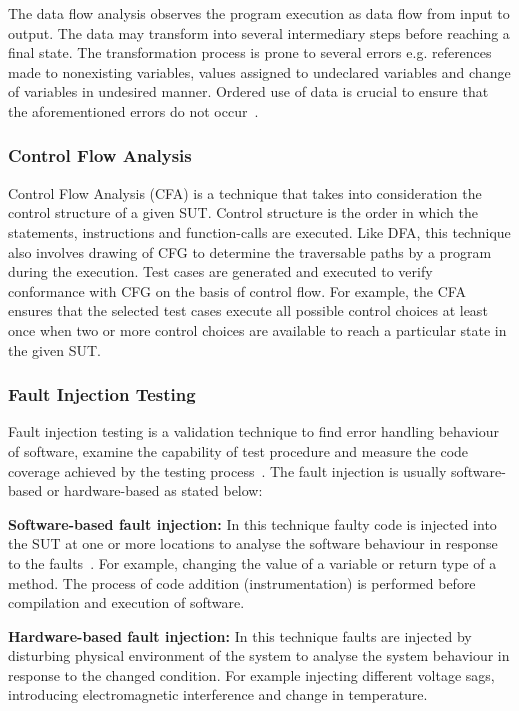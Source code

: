 The data flow analysis observes the program execution as data flow from input to output. The data may transform into several intermediary steps before reaching a final state. The transformation process is prone to several errors e.g. references made to nonexisting variables, values assigned to undeclared variables and change of variables in undesired manner. Ordered use of data is crucial to ensure that the aforementioned errors do not occur~\cite{fosdick1976data}.

\subsubsection{Control Flow Analysis}
Control Flow Analysis (CFA) is a technique that takes into consideration the control structure of a given SUT. Control structure is the order in which the statements, instructions and function-calls are executed. Like DFA, this technique also involves drawing of CFG to determine the traversable paths by a program during the execution. Test cases are generated and executed to verify conformance with CFG on the basis of control flow. For example, the CFA ensures that the selected test cases execute all possible control choices at least once when two or more control choices are available to reach a particular state in the given SUT. %

\subsubsection{Fault Injection Testing}
Fault injection testing is a validation technique to find error handling behaviour of software, examine the capability of test procedure and measure the code coverage achieved by the testing process~\cite{arlat1990validation}. The fault injection is usually software-based or hardware-based as stated below:

\textbf{Software-based fault injection:} In this technique faulty code is injected into the SUT at one or more locations to analyse the software behaviour in response to the faults~\cite{voas1997software}. For example, changing the value of a variable or return type of a method. The process of code addition (instrumentation) is performed before compilation and execution of software. 

\textbf{Hardware-based fault injection:} In this technique faults are injected by disturbing physical environment of the system to analyse the system behaviour in response to the changed condition. For example injecting different voltage sags, introducing electromagnetic interference and change in temperature.

